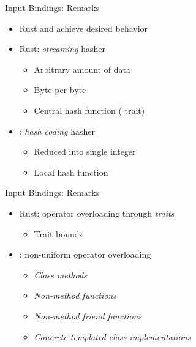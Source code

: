 \begin{frame}[t]{Input Bindings: Remarks}

    \begin{itemize}
        \itemsep.3em

        \item Rust and \cpp achieve desired behavior

        \item Rust: \textit{streaming} hasher
            \begin{itemize}
                \item Arbitrary amount of data
                \item Byte-per-byte
                \item Central hash function ( trait)
            \end{itemize}

        \item \cpp: \textit{hash coding} hasher
            \begin{itemize}
                \item Reduced into single integer
                \item Local hash function
            \end{itemize}

    \end{itemize}

    \vfill

\end{frame}

\begin{frame}[t]{Input Bindings: Remarks}

    \begin{itemize}
        \itemsep.3em

        \item Rust: operator overloading through \textit{traits}
            \begin{itemize}
                \item Trait bounds
            \end{itemize}

        \item \cpp: non-uniform operator overloading
            \begin{itemize}
                \item \textit{Class methods}
                \item \textit{Non-method functions}
                \item \textit{Non-method friend functions}
                \item \textit{Concrete templated class implementations}
            \end{itemize}

    \end{itemize}

    \vfill

\end{frame}

